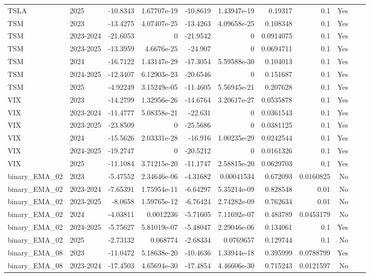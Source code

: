 \begin{longtable}{llrrrrrrrrl}
TSLA & 2025 & -10.8343 & 1.67707e-19 & -10.8619 & 1.43947e-19 & 0.19317 & 0.1 & Yes \\
TSM & 2023 & -13.4275 & 4.07407e-25 & -13.4263 & 4.09658e-25 & 0.108348 & 0.1 & Yes \\
TSM & 2023-2024 & -21.6053 & 0 & -21.9542 & 0 & 0.0914075 & 0.1 & Yes \\
TSM & 2023-2025 & -13.3959 & 4.6676e-25 & -24.907 & 0 & 0.0694711 & 0.1 & Yes \\
TSM & 2024 & -16.7122 & 1.43147e-29 & -17.3054 & 5.59588e-30 & 0.104013 & 0.1 & Yes \\
TSM & 2024-2025 & -12.3407 & 6.12903e-23 & -20.6546 & 0 & 0.151687 & 0.1 & Yes \\
TSM & 2025 & -4.92249 & 3.15249e-05 & -11.4605 & 5.56945e-21 & 0.207628 & 0.1 & Yes \\
VIX & 2023 & -14.2799 & 1.32956e-26 & -14.6764 & 3.20617e-27 & 0.0535878 & 0.1 & Yes \\
VIX & 2023-2024 & -11.4777 & 5.08358e-21 & -22.631 & 0 & 0.0361543 & 0.1 & Yes \\
VIX & 2023-2025 & -23.8509 & 0 & -25.5686 & 0 & 0.0381125 & 0.1 & Yes \\
VIX & 2024 & -15.5626 & 2.03331e-28 & -16.916 & 1.00235e-29 & 0.0242544 & 0.1 & Yes \\
VIX & 2024-2025 & -19.2747 & 0 & -20.5212 & 0 & 0.0161326 & 0.1 & Yes \\
VIX & 2025 & -11.1084 & 3.71215e-20 & -11.1747 & 2.58815e-20 & 0.0629703 & 0.1 & Yes \\
binary\_EMA\_02 & 2023 & -5.47552 & 2.34646e-06 & -4.31682 & 0.00041534 & 0.672093 & 0.0160825 & No \\
binary\_EMA\_02 & 2023-2024 & -7.65391 & 1.75954e-11 & -6.64297 & 5.35214e-09 & 0.828548 & 0.01 & No \\
binary\_EMA\_02 & 2023-2025 & -8.0658 & 1.59765e-12 & -6.76424 & 2.74282e-09 & 0.762634 & 0.01 & No \\
binary\_EMA\_02 & 2024 & -4.03811 & 0.0012236 & -5.71605 & 7.11692e-07 & 0.483789 & 0.0453179 & No \\
binary\_EMA\_02 & 2024-2025 & -5.75627 & 5.81019e-07 & -5.48047 & 2.29046e-06 & 0.134061 & 0.1 & Yes \\
binary\_EMA\_02 & 2025 & -2.73132 & 0.068774 & -2.68334 & 0.0769657 & 0.129744 & 0.1 & No \\
binary\_EMA\_08 & 2023 & -11.0472 & 5.18638e-20 & -10.4636 & 1.33944e-18 & 0.395999 & 0.0788799 & Yes \\
binary\_EMA\_08 & 2023-2024 & -17.4503 & 4.65694e-30 & -17.4854 & 4.46606e-30 & 0.715243 & 0.0121597 & No \\

\end{longtable}

